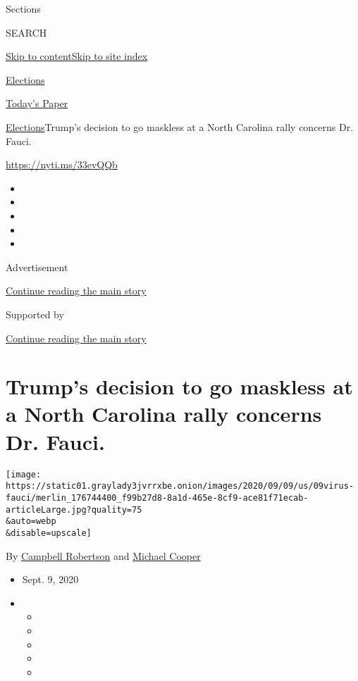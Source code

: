 Sections

SEARCH

\protect\hyperlink{site-content}{Skip to
content}\protect\hyperlink{site-index}{Skip to site index}

\href{https://www.nytimes3xbfgragh.onion/news-event/2020-election}{Elections}

\href{https://myaccount.nytimes3xbfgragh.onion/auth/login?response_type=cookie\&client_id=vi}{}

\href{https://www.nytimes3xbfgragh.onion/section/todayspaper}{Today's
Paper}

\href{/news-event/2020-election}{Elections}\textbar{}Trump's decision to
go maskless at a North Carolina rally concerns Dr. Fauci.

\url{https://nyti.ms/33evQQb}

\begin{itemize}
\item
\item
\item
\item
\item
\end{itemize}

Advertisement

\protect\hyperlink{after-top}{Continue reading the main story}

Supported by

\protect\hyperlink{after-sponsor}{Continue reading the main story}

\hypertarget{trumps-decision-to-go-maskless-at-a-north-carolina-rally-concerns-dr-fauci}{%
\section{Trump's decision to go maskless at a North Carolina rally
concerns Dr.
Fauci.}\label{trumps-decision-to-go-maskless-at-a-north-carolina-rally-concerns-dr-fauci}}

\texttt{[image: https://static01.graylady3jvrrxbe.onion/images/2020/09/09/us/09virus-fauci/merlin\_176744400\_f99b27d8-8a1d-465e-8cf9-ace81f71ecab-articleLarge.jpg?quality=75\\\&auto=webp\\\&disable=upscale]}

By
\href{https://www.nytimes3xbfgragh.onion/by/campbell-robertson}{Campbell
Robertson} and
\href{https://www.nytimes3xbfgragh.onion/by/michael-cooper}{Michael
Cooper}

\begin{itemize}
\item
  Sept. 9, 2020
\item
  \begin{itemize}
  \item
  \item
  \item
  \item
  \item
  \end{itemize}
\end{itemize}

